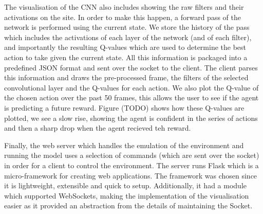 
The visualisation of the CNN also includes showing the raw filters and their activations on the site. In order to make this happen, a forward pass of the network is performed using the current state. We store the history of the pass which includes the activations of each layer of the network (and of each filter), and importantly the resulting Q-values which are used to determine the best action to take given the current state. All this information is packaged into a predefined JSON format and sent over the socket to the client. The client parses this information and draws the pre-processed frame, the filters of the selected convolutional layer and the Q-values for each action. We also plot the Q-value of the chosen action over the past 50 frames, this allows the user to see if the agent is predicting a future reward. Figure (TODO) shows how these Q-values are plotted, we see a slow rise, showing the agent is confident in the series of actions and then a sharp drop when the agent recieved teh reward.


Finally, the web server which handles the emulation of the environment and running the model uses a selection of commands (which are sent over the socket) in order for a client to control the environment. The server runs Flask which is a micro-framework for creating web applications. The framework was chosen since it is lightweight, extensible and quick to setup. Additionally, it had a module which supported WebSockets, making the implementation of the visualisation easier as it provided an abstraction from the details of maintaining the Socket.